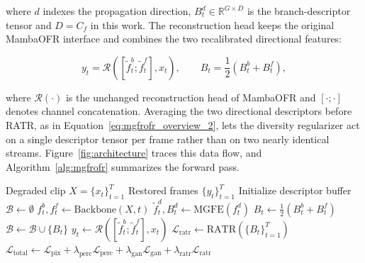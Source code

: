 \documentclass[symmetry,article,submit,pdftex,moreauthors]{Definitions/mdpi}
\begin{document}
where $d$ indexes the propagation direction, $B_t^{d} \in \mathbb{R}^{G \times D}$ is the branch-descriptor tensor and $D=C_f$ in this work. The reconstruction head keeps the original MambaOFR interface and combines the two recalibrated directional features:

\begin{equation}
y_t = \mathcal{R}\!\left([\widetilde{f}_t^{b};\widetilde{f}_t^{f}], x_t\right),
\qquad
B_t = \frac{1}{2}\left(B_t^{b}+B_t^{f}\right),
\label{eq:mgfrofr_overview_2}
\end{equation}

where $\mathcal{R}(\cdot)$ is the unchanged reconstruction head of MambaOFR and $[\cdot;\cdot]$ denotes channel concatenation. Averaging the two directional descriptors before RATR, as in Equation~\eqref{eq:mgfrofr_overview_2}, lets the diversity regularizer act on a single descriptor tensor per frame rather than on two nearly identical streams. Figure~\ref{fig:architecture} traces this data flow, and Algorithm~\ref{alg:mgfrofr} summarizes the forward pass.

\begin{algorithm}[H]
\caption{MgfrOFR forward pass for a clip of length $T$.\label{alg:mgfrofr}}
\begin{algorithmic}[1]
\Require Degraded clip $X=\{x_t\}_{t=1}^{T}$
\Ensure Restored frames $\{y_t\}_{t=1}^{T}$
\State Initialize descriptor buffer $\mathcal{B} \leftarrow \emptyset$
    \State $f_t^{b}, f_t^{f} \leftarrow \text{Backbone}(X, t)$ 
        \State $\widetilde{f}_t^{d}, B_t^{d} \leftarrow \text{MGFE}(f_t^{d})$ 
    \EndFor
    \State $B_t \leftarrow \frac{1}{2}(B_t^{b} + B_t^{f})$ 
    \State $\mathcal{B} \leftarrow \mathcal{B} \cup \{B_t\}$ 
    \State $y_t \leftarrow \mathcal{R}([\widetilde{f}_t^{b}; \widetilde{f}_t^{f}], x_t)$ 
\EndFor
{}
    \State $\mathcal{L}_{\text{ratr}} \leftarrow \text{RATR}(\{B_t\}_{t=1}^{T})$ 
    \State $\mathcal{L}_{\text{total}} \leftarrow \mathcal{L}_{\text{pix}} + \lambda_{\text{perc}}\mathcal{L}_{\text{perc}} + \lambda_{\text{gan}}\mathcal{L}_{\text{gan}} + \lambda_{\text{ratr}}\mathcal{L}_{\text{ratr}}$
\EndIf
\end{algorithmic}
\end{algorithm}
\end{document}

